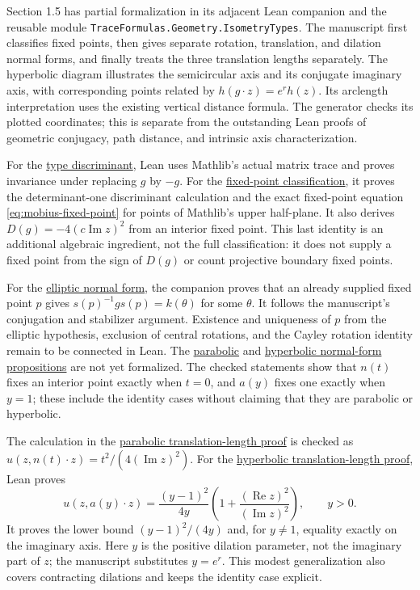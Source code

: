 Section 1.5 has partial formalization in its adjacent Lean companion and the reusable module \texttt{TraceFormulas.Geometry.IsometryTypes}. The manuscript first classifies fixed points, then gives separate rotation, translation, and dilation normal forms, and finally treats the three translation lengths separately. The hyperbolic diagram illustrates the semicircular axis and its conjugate imaginary axis, with corresponding points related by $h(g\cdot z)=e^r h(z)$. Its arclength interpretation uses the existing vertical distance formula. The generator checks its plotted coordinates; this is separate from the outstanding Lean proofs of geometric conjugacy, path distance, and intrinsic axis characterization.

For the \hyperref[hyperbolic.types]{type discriminant}, Lean uses Mathlib's actual matrix trace and proves invariance under replacing $g$ by $-g$. For the \hyperref[hyperbolic.fixed-point-classification]{fixed-point classification}, it proves the determinant-one discriminant calculation and the exact fixed-point equation \eqref{eq:mobius-fixed-point} for points of Mathlib's upper half-plane. It also derives $D(g)=-4(c\operatorname{Im}z)^2$ from an interior fixed point. This last identity is an additional algebraic ingredient, not the full classification: it does not supply a fixed point from the sign of $D(g)$ or count projective boundary fixed points.

For the \hyperref[hyperbolic.elliptic-normal-form]{elliptic normal form}, the companion proves that an already supplied fixed point $p$ gives $s(p)^{-1}gs(p)=k(\theta)$ for some $\theta$. It follows the manuscript's conjugation and stabilizer argument. Existence and uniqueness of $p$ from the elliptic hypothesis, exclusion of central rotations, and the Cayley rotation identity remain to be connected in Lean. The \hyperref[hyperbolic.parabolic-normal-form]{parabolic} and \hyperref[hyperbolic.hyperbolic-normal-form]{hyperbolic normal-form propositions} are not yet formalized. The checked statements show that $n(t)$ fixes an interior point exactly when $t=0$, and $a(y)$ fixes one exactly when $y=1$; these include the identity cases without claiming that they are parabolic or hyperbolic.

The calculation in the \hyperref[hyperbolic.parabolic-length]{parabolic translation-length proof} is checked as $u(z,n(t)\cdot z)=t^2/(4(\operatorname{Im}z)^2)$. For the \hyperref[hyperbolic.hyperbolic-length]{hyperbolic translation-length proof}, Lean proves
\[
 u(z,a(y)\cdot z)
 =\frac{(y-1)^2}{4y}\left(1+\frac{(\operatorname{Re}z)^2}{(\operatorname{Im}z)^2}\right),
 \qquad y>0.
\]
It proves the lower bound $(y-1)^2/(4y)$ and, for $y\ne1$, equality exactly on the imaginary axis. Here $y$ is the positive dilation parameter, not the imaginary part of $z$; the manuscript substitutes $y=e^r$. This modest generalization also covers contracting dilations and keeps the identity case explicit.

